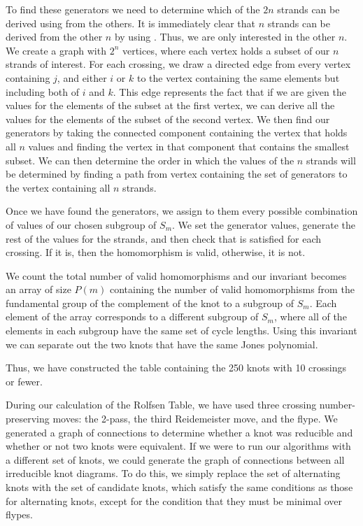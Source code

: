 \begin{paper}
To find these generators we need to determine which of the $2n$ strands can be
derived using \eqBoth from the others.
It is immediately clear that $n$ strands can be derived from the other $n$ by
using \eqUpper.
Thus, we are only interested in the other $n$.
We create a graph with $2^n$ vertices, where each vertex holds a subset of our
$n$ strands of interest.
For each crossing, we draw a directed edge from every vertex containing $j$, and
either $i$ or $k$ to the vertex containing the same elements but including both
of $i$ and $k$.
This edge represents the fact that if we are given the values for the elements
of the subset at the first vertex, we can derive all the values for the elements
of the subset of the second vertex.
We then find our generators by taking the connected component containing the
vertex that holds all $n$ values and finding the vertex in that component that
contains the smallest subset.
We can then determine the order in which the values of the $n$ strands will be
determined by finding a path from vertex containing the set of generators to the
vertex containing all $n$ strands.

Once we have found the generators, we assign to them every possible
combination of values of our chosen subgroup of $S_m$.
We set the generator values, generate the rest of the values for the strands,
and then check that \eqBoth is satisfied for each crossing.
If it is, then the homomorphism is valid, otherwise, it is not.

We count the total number of valid homomorphisms and our invariant becomes an
array of size $P(m)$ containing the number of valid homomorphisms from the
fundamental group of the complement of the knot to a subgroup of $S_m$.
Each element of the array corresponds to a different subgroup of $S_m$, where
all of the elements in each subgroup have the same set of cycle lengths.
Using this invariant we can separate out the two knots that have the same Jones
polynomial.

Thus, we have constructed the table containing the 250 knots with 10 crossings
or fewer.


During our calculation of the Rolfsen Table, we have used three crossing
number-preserving moves: the 2-pass, the third Reidemeister move, and the flype.
We generated a graph of connections to determine whether a knot was reducible
and whether or not two knots were equivalent.
If we were to run our algorithms with a different set of knots, we could
generate the graph of connections between all irreducible knot diagrams.
To do this, we simply replace the set of alternating knots with the set of
candidate knots, which satisfy the same conditions as those for alternating
knots, except for the condition that they must be minimal over flypes.


\end{paper}
